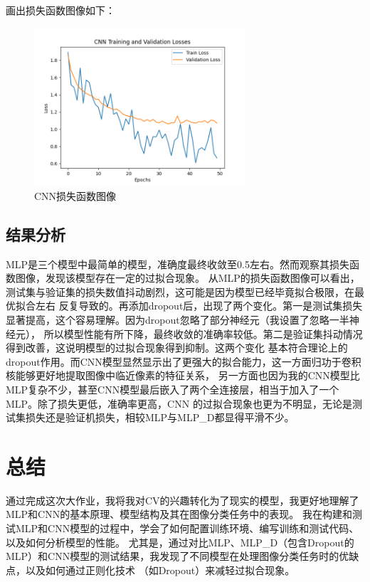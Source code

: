 \documentclass[UTF8]{ctexart}
\begin{document}
画出损失函数图像如下：
\begin{figure}[h]
    \centering
    \includegraphics[width=0.7\textwidth]{CNN_loss_curve.png}
    \caption*{CNN损失函数图像}
\end{figure}

\newpage

\subsection{结果分析}
MLP是三个模型中最简单的模型，准确度最终收敛至0.5左右。然而观察其损失函数图像，发现该模型存在一定的过拟合现象。
从MLP的损失函数图像可以看出，测试集与验证集的损失数值抖动剧烈，这可能是因为模型已经毕竟拟合极限，在最优拟合左右
反复导致的。再添加dropout后，出现了两个变化。第一是测试集损失显著提高，这个容易理解。因为dropout忽略了部分神经元（我设置了忽略一半神经元），
所以模型性能有所下降，最终收敛的准确率较低。第二是验证集抖动情况得到改善，这说明模型的过拟合现象得到抑制。这两个变化
基本符合理论上的dropout作用。而CNN模型显然显示出了更强大的拟合能力，这一方面归功于卷积核能够更好地提取图像中临近像素的特征关系，
另一方面也因为我的CNN模型比MLP复杂不少，甚至CNN模型最后嵌入了两个全连接层，相当于加入了一个MLP。除了损失更低，准确率更高，CNN
的过拟合现象也更为不明显，无论是测试集损失还是验证机损失，相较MLP与MLP\_D都显得平滑不少。

\section{总结}
通过完成这次大作业，我将我对CV的兴趣转化为了现实的模型，我更好地理解了MLP和CNN的基本原理、模型结构及其在图像分类任务中的表现。
我在构建和测试MLP和CNN模型的过程中，学会了如何配置训练环境、编写训练和测试代码、以及如何分析模型的性能。
尤其是，通过对比MLP、MLP\_D（包含Dropout的MLP）和CNN模型的测试结果，我发现了不同模型在处理图像分类任务时的优缺点，以及如何通过正则化技术
（如Dropout）来减轻过拟合现象。
\end{document}
